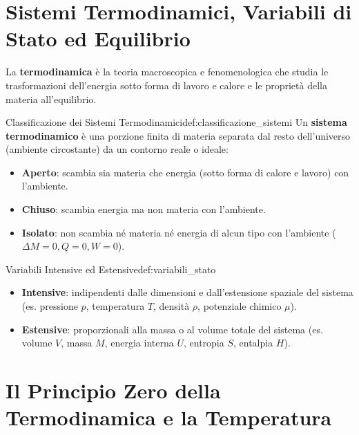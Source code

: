 \section{Sistemi Termodinamici, Variabili di Stato ed Equilibrio}
\label{sec:sistemi_termodinamici}

La \textbf{termodinamica} è la teoria macroscopica e fenomenologica che studia le trasformazioni dell'energia sotto forma di lavoro e calore e le proprietà della materia all'equilibrio.

\begin{definizione}{Classificazione dei Sistemi Termodinamici}{def:classificazione_sistemi}
Un \textbf{sistema termodinamico} è una porzione finita di materia separata dal resto dell'universo (ambiente circostante) da un contorno reale o ideale:
\begin{itemize}
    \item \textbf{Aperto}: scambia sia materia che energia (sotto forma di calore e lavoro) con l'ambiente.
    \item \textbf{Chiuso}: scambia energia ma non materia con l'ambiente.
    \item \textbf{Isolato}: non scambia né materia né energia di alcun tipo con l'ambiente ($\Delta M = 0, Q = 0, W = 0$).
\end{itemize}
\end{definizione}

\begin{definizione}{Variabili Intensive ed Estensive}{def:variabili_stato}
\begin{itemize}
    \item \textbf{Intensive}: indipendenti dalle dimensioni e dall'estensione spaziale del sistema (es. pressione $p$, temperatura $T$, densità $\rho$, potenziale chimico $\mu$).
    \item \textbf{Estensive}: proporzionali alla massa o al volume totale del sistema (es. volume $V$, massa $M$, energia interna $U$, entropia $S$, entalpia $H$).
\end{itemize}
\end{definizione}

\section{Il Principio Zero della Termodinamica e la Temperatura}
\label{sec:principio_zero}

